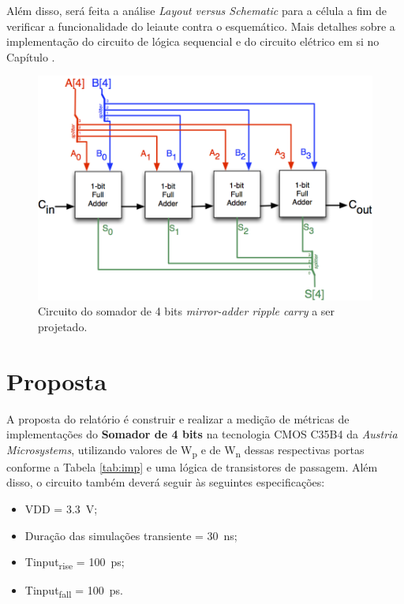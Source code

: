 \documentclass{iiufrgs}
\begin{document}
Além disso, será feita a análise \textit{Layout versus Schematic} para a célula a fim de  verificar a funcionalidade do leiaute contra o esquemático. Mais detalhes sobre a implementação do circuito de lógica sequencial e do circuito elétrico em si no Capítulo .

\begin{figure}[htb]
    \centering
    \caption{Circuito do somador de 4 bits \textit{mirror-adder ripple carry} a ser projetado.}
    \label{fig:4bit_pretty}
    \includegraphics[scale=0.65]{images/pretty.png}
\end{figure}

\chapter{Proposta}\label{proposta}
A proposta do relatório é construir e realizar a medição de métricas de implementações do \textbf{Somador de 4 bits} na tecnologia CMOS C35B4 da \textit{Austria Microsystems}, utilizando valores de W\textsubscript{p} e de W\textsubscript{n} dessas respectivas portas conforme a Tabela \ref{tab:imp} e uma lógica de transistores de passagem.
Além disso, o circuito também deverá seguir às seguintes especificações:

\begin{itemize}[noitemsep]
    \setlength{\itemindent}{1em}
    \item VDD = \SI{3.3}{\V};
    \item Duração das simulações transiente = \SI{30}{\ns};
    \item Tinput\textsubscript{rise} = \SI{100}{\ps};
    \item Tinput\textsubscript{fall} = \SI{100}{\ps}.
\end{itemize}
\end{document}
